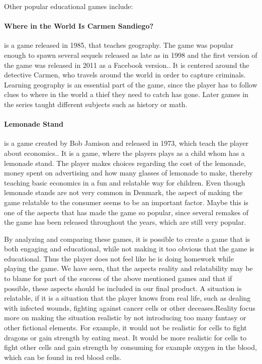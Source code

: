 Other popular educational games include:

\paragraph{Where in the World Is Carmen Sandiego?} is a game released in 1985, that teaches geography. The game was popular enough to spawn several sequels released as late as in 1998 and the first version of the game was released in 2011 as a Facebook version.\cite{carmensandiego}. It is centered around the detective Carmen, who travels around the world in order to capture criminals. Learning geography is an essential part of the game, since the player has to follow clues to where in the world a thief they need to catch has gone. Later games in the series taught different subjects such as history or math.

\paragraph{Lemonade Stand} is a game created by Bob Jamison and released in 1973, which teach the player about economics.\cite{lemonadestand}. It is a game, where the players plays as a child whom has a lemonade stand.
The player makes choices regarding the cost of the lemonade, money spent on advertising and how many glasses of lemonade to make, thereby teaching basic economics in a fun and relatable way for children. Even though lemonade stands are not very common in Denmark, the aspect of making the game relatable to the consumer seems to be an important factor. Maybe this is one of the aspects that has made the game so popular, since several remakes of the game has been released throughout the years, which are still very popular.\newline

By analyzing and comparing these games, it is possible to create a game that is both engaging and educational, while not making it too obvious that the game is educational. Thus the player does not feel like he is doing homework while playing the game. We have seen, that the aspects reality and relatability may be to blame for part of the success of the above mentioned games and that if possible, these aspects should be included in our final product.  A situation is relatable, if it is a situation that the player knows from real life, such as dealing with infected wounds, fighting against cancer cells or other deceases.Reality focus more on making the situation realistic by not introducing too many fantasy or other fictional elements. For example, it would not be realistic for cells to fight dragons or gain strength by eating meat. It would be more realistic for cells to fight other cells and gain strength by consuming for example oxygen in the blood, which can be found in red blood cells.

